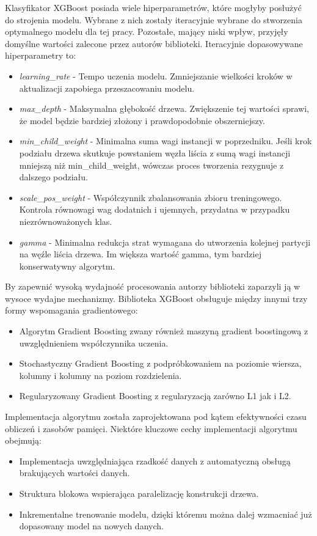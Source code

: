 \documentclass[polish, twoside, 12pt, a4paper]{article}
\theoremstyle{definition}
\theoremstyle{plain}
\theoremstyle{remark}
\begin{document}
Klasyfikator XGBoost posiada wiele hiperparametrów, które mogłyby posłużyć do strojenia modelu. Wybrane z nich zostały iteracyjnie wybrane do stworzenia optymalnego modelu dla tej pracy. Pozostałe, mający niski wpływ, przyjęły domyślne wartości zalecone przez autorów biblioteki. Iteracyjnie dopasowywane hiperparametry to:
\begin{itemize}[noitemsep]
 \item \emph{learning\_rate} - Tempo uczenia modelu. Zmniejszanie wielkości kroków w aktualizacji zapobiega przeszacowaniu modelu.
 \item \emph{max\_depth} - Maksymalna głębokość drzewa. Zwiększenie tej wartości sprawi, że model będzie bardziej złożony i prawdopodobnie obszerniejszy.
 \item \emph{min\_child\_weight} - Minimalna suma wagi instancji w poprzedniku. Jeśli krok podziału drzewa skutkuje powstaniem węzła liścia z sumą wagi instancji mniejszą niż min\_child\_weight, wówczas proces tworzenia rezygnuje z dalszego podziału. 
 \item \emph{scale\_pos\_weight} - Współczynnik zbalansowania zbioru treningowego. Kontrola równowagi wag dodatnich i ujemnych, przydatna w przypadku niezrównoważonych klas.
 \item \emph{gamma} - Minimalna redukcja strat wymagana do utworzenia kolejnej partycji na węźle liścia drzewa. Im większa wartość gamma, tym bardziej konserwatywny algorytm.
\end{itemize}

By zapewnić wysoką wydajność procesowania autorzy biblioteki zaparzyli ją w wysoce wydajne mechanizmy. Biblioteka XGBoost obsługuje między innymi trzy formy wspomagania gradientowego:
\begin{itemize}[noitemsep]
  \item Algorytm Gradient Boosting zwany również maszyną gradient boostingową z uwzględnieniem współczynnika uczenia.
  \item Stochastyczny Gradient Boosting z podpróbkowaniem na poziomie wiersza, kolumny i kolumny na poziom rozdzielenia.
  \item Regularyzowany Gradient Boosting z regularyzacją zarówno L1 jak i L2.
\end{itemize}

Implementacja algorytmu została zaprojektowana pod kątem efektywności czasu obliczeń i zasobów pamięci. Niektóre kluczowe cechy implementacji algorytmu obejmują:
\begin{itemize}[noitemsep]
 \item Implementacja uwzględniająca rzadkość danych z automatyczną obsługą brakujących wartości danych.
 \item Struktura blokowa wspierająca paralelizację konstrukcji drzewa.
 \item Inkrementalne trenowanie modelu, dzięki któremu można dalej wzmacniać już dopasowany model na nowych danych.
\end{itemize}
\end{document}
